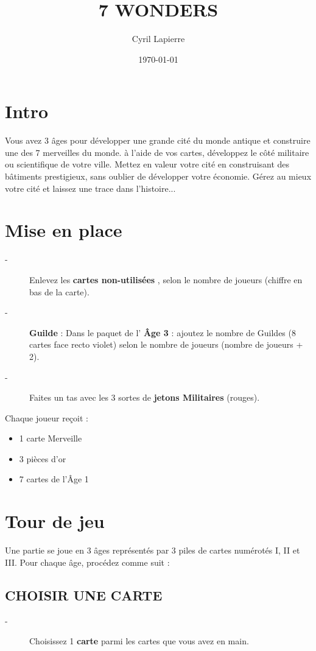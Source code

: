 \documentclass{article}%
\title{7 WONDERS}%
\author{Cyril Lapierre}%
\date{\today}%
\begin{document}
%
\normalsize%
\maketitle%
\pagestyle{header}%
\section{ Intro
}%
\label{sec:Intro}%
Vous avez 3 âges pour développer une grande cité du monde antique et construire une des 7 merveilles du
%
monde. à l’aide de vos cartes, développez le côté militaire ou scientifique de votre ville. Mettez en valeur
%
votre cité en construisant des bâtiments prestigieux, sans oublier de développer votre économie.
%
Gérez au mieux votre cité et laissez une trace dans l'histoire...


%
\section{ Mise en place
}%
\label{sec:Miseenplace}%
\begin{description}%
\item[{-} ]%
%
 Enlevez les %
\textbf{cartes non{-}utilisées}%
, selon le nombre de joueurs (chiffre en bas de la carte).
%
\item[{-} ]%
%
\textbf{Guilde}%
\textit{ }%
 : Dans le paquet de l'%
\textbf{Âge 3}%
\textit{ }%
 : ajoutez le nombre de Guildes (8 cartes face recto violet) selon le nombre de joueurs (nombre de joueurs + 2).
%
\item[{-} ]%
%
 Faites un tas avec les 3 sortes de %
\textbf{jetons Militaires}%
\textit{ }%
 (rouges).
%
\end{description}%
Chaque joueur reçoit :
%
\begin{itemize}%
\item%
%
 1 carte Merveille
%
\item%
%
 3 pièces d’or
%
\item%
%
 7 cartes de l'Âge 1
%
\end{itemize}

%
\section{ Tour de jeu
}%
\label{sec:Tourdejeu}%
Une partie se joue en 3 âges représentés par 3 piles de cartes numérotés I, II et III. Pour chaque âge, procédez comme suit :


%
\subsection{ CHOISIR UNE CARTE
}%
\label{subsec:CHOISIRUNECARTE}%
\begin{description}%
\item[{-} ]%
%
 Choisissez 1 %
\textbf{carte}%
\textit{ }%
 parmi les cartes que vous avez en main.
%
\end{description}
\end{document}
